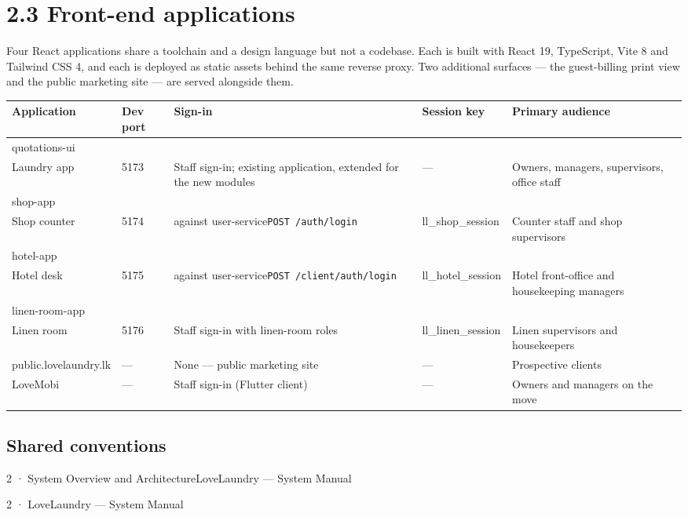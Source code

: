 \documentclass[11pt,a4paper,oneside]{book}
\begin{document}
\section{2.3 Front-end applications}
Four React applications share a toolchain and a design language but not a codebase. Each is built with React 19, TypeScript, Vite 8 and Tailwind CSS 4, and each is deployed as static assets behind the same reverse proxy. Two additional surfaces — the guest-billing print view and the public marketing site — are served alongside them.

\begin{center}\small
\begin{tabularx}{\linewidth}{|X|X|X|X|X|}
\hline
\rowcolor{lightgrey}
\textbf{Application} & \textbf{Dev port} & \textbf{Sign-in} & \textbf{Session key} & \textbf{Primary audience} \\ \hline
quotations-ui \\ Laundry app & 5173 & Staff sign-in; existing application, extended for the new modules & — & Owners, managers, supervisors, office staff \\ \hline
shop-app \\ Shop counter & 5174 & against user-service\texttt{POST /auth/login} & ll\_shop\_session & Counter staff and shop supervisors \\ \hline
hotel-app \\ Hotel desk & 5175 & against user-service\texttt{POST /client/auth/login} & ll\_hotel\_session & Hotel front-office and housekeeping managers \\ \hline
linen-room-app \\ Linen room & 5176 & Staff sign-in with linen-room roles & ll\_linen\_session & Linen supervisors and housekeepers \\ \hline
public.lovelaundry.lk & — & None — public marketing site & — & Prospective clients \\ \hline
LoveMobi & — & Staff sign-in (Flutter client) & — & Owners and managers on the move \\ \hline
\end{tabularx}
\end{center}
\subsection*{Shared conventions}
2 · System Overview and ArchitectureLoveLaundry — System Manual

2 · LoveLaundry — System Manual
\end{document}
